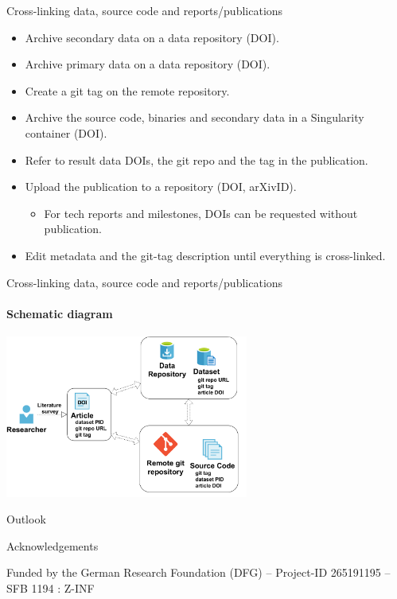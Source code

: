 \documentclass[
	ngerman,%
	aspectratio=169,%
	color={accentcolor=2d},
	logo=true,%
	colorframetitle=true,%
	]{tudabeamer}
\begin{document}

\begin{frame}{Cross-linking data, source code and reports/publications} 
	
	\vfill
	\begin{itemize}
		\item Archive secondary data on a data repository (DOI). 
		\item Archive primary data on a data repository (DOI). 
		\item Create a git tag on the remote repository. 
		\item Archive the source code, binaries and secondary data in a Singularity container (DOI). 
		\item Refer to result data DOIs, the git repo and the tag in the publication.
		\item Upload the publication to a repository (DOI, arXivID).
			\begin{itemize}
				\item For tech reports and milestones, DOIs can be requested without publication.
			\end{itemize}
		\item Edit metadata and the git-tag description until everything is cross-linked.
	\end{itemize}

\end{frame}

\begin{frame}{Cross-linking data, source code and reports/publications} 
	\framesubtitle{Schematic diagram}
	
	\begin{center}
		\includegraphics[width=0.6\textwidth]{figures/cross-linking.pdf}
	\end{center}

\end{frame}


\begin{frame}{Outlook}

\end{frame}

\begin{frame}{Acknowledgements}

	\vfill
	\begin{center}
		{\large 			
			Funded by the German Research Foundation (DFG) – Project-ID 265191195 – SFB 1194 : Z-INF
		}
	\end{center}

\end{frame}
\end{document}
